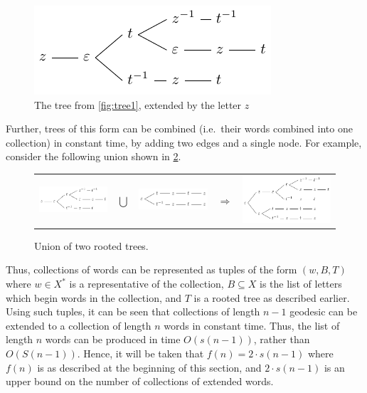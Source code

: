 \begin{figure}[!ht]
	\centering

	\includegraphics{figures/geodesicGenerating/treeRep2}

	\caption{The tree from \cref{fig:tree1}, extended by the letter $z$}
	\label{fig:tree2}
\end{figure}

Further, trees of this form can be combined (i.e.\ their words combined into one collection) in constant time, by adding two edges and a single node.
For example, consider the following union shown in \cref{fig:tree3}.

\begin{figure}[h!]
\begin{center}
	\begin{tabular}{m{3.5cm} m{1em} m{3.5cm} m{2em} m{4.5cm}}
		\includegraphics[width=3.5cm]{figures/geodesicGenerating/treeRep2}
		&
		\hfill
		$\bigcup$
		\hfill
		&
		\includegraphics[width=3.5cm]{figures/geodesicGenerating/treeRep3}
		&
		\hfill
		$\Longrightarrow$
		\hfill
		&
		\includegraphics[width=4.5cm]{figures/geodesicGenerating/treeRep4Combined}
	\end{tabular}
\end{center}
\caption{Union of two rooted trees.}
	\label{fig:tree3}
\end{figure}


Thus, collections of words can be represented as tuples of the form $(w,B,T)$ where $w \in X^\ast$ is a representative of the collection, $B \subseteq X$ is the list of letters which begin words in the collection, and $T$ is a rooted tree as described earlier.
Using such tuples, it can be seen that collections of length $n-1$ geodesic can be extended to a collection of length $n$ words in constant time.
Thus, the list of length $n$ words can be produced in time $O(s(n-1))$, rather than $O(S(n-1))$.
Hence, it will be taken that $f(n) = 2 \cdot s(n-1)$ where $f(n)$ is as described at the beginning of this section, and $2 \cdot s(n-1)$ is an upper bound on the number of collections of extended words.

